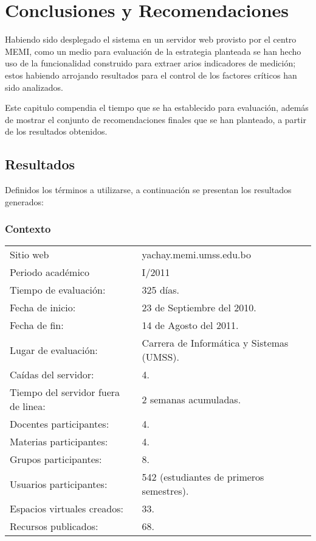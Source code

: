 \chapter{Conclusiones y Recomendaciones}

Habiendo sido desplegado el sistema en un servidor web provisto por el centro
MEMI, como un medio para evaluación de la estrategia planteada se han hecho uso
de la funcionalidad construido para extraer arios indicadores de medición; estos
habiendo arrojando resultados para el control de los factores críticos han sido
analizados.

Este capitulo compendia el tiempo que se ha establecido para evaluación, además
de mostrar el conjunto de recomendaciones finales que se han planteado, a partir
de los resultados obtenidos.

\section{Resultados}

Definidos los términos a utilizarse, a continuación se presentan los resultados
generados:

\subsection{Contexto}
\begin{center}
\begin{tabular}{|l|l|}
\hline
Sitio web & yachay.memi.umss.edu.bo \\
Periodo académico & I/2011 \\
Tiempo de evaluación: & 325 días. \\
Fecha de inicio: & 23 de Septiembre del 2010. \\
Fecha de fin: & 14 de Agosto del 2011. \\
Lugar de evaluación: & Carrera de Informática y Sistemas (UMSS). \\
Caídas del servidor: & 4. \\
Tiempo del servidor fuera de linea: & 2 semanas acumuladas. \\
Docentes participantes: & 4. \\
Materias participantes: & 4. \\
Grupos participantes: & 8. \\
Usuarios participantes: & 542 (estudiantes de primeros semestres). \\
Espacios virtuales creados: & 33. \\
Recursos publicados: & 68. \\
\hline
\end{tabular}
\end{center}

